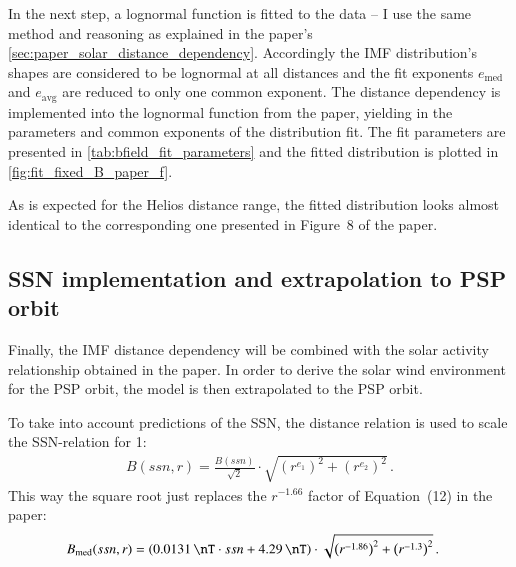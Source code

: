 In the next step, a lognormal function is fitted to the data -- I use the same method and reasoning as explained in the paper's \autoref{sec:paper_solar_distance_dependency}. Accordingly the IMF distribution's shapes are considered to be lognormal at all distances and the fit exponents $e_\text{med}$ and $e_\text{avg}$ are reduced to only one common exponent. The distance dependency is implemented into the lognormal function from the paper, yielding in the parameters and common exponents of the distribution fit. The fit parameters are presented in \autoref{tab:bfield_fit_parameters} and the fitted distribution is plotted in \autoref{fig:fit_fixed_B_paper_f}.
\begin{figure}[htb]
\end{figure}
As is expected for the Helios distance range, the fitted distribution looks almost identical to the corresponding one presented in Figure~8 of the paper.

\subsection{SSN implementation and extrapolation to PSP orbit}
Finally, the IMF distance dependency will be combined with the solar activity relationship obtained in the paper. In order to derive the solar wind environment for the PSP orbit, the model is then extrapolated to the PSP orbit.

To take into account predictions of the SSN, the distance relation is used to scale the SSN-relation for \SI{1}{\au}:
\begin{align}
	B(ssn,r) = \frac{B(ssn)}{\sqrt{2}} \cdot \sqrt{\left(r^{e_1}\right)^2 + \left(r^{e_2}\right)^2}	\,.
\end{align}
This way the square root just replaces the $r^{-1.66}$ factor of Equation~(12) in the paper:
\begin{align}
	B_\text{med}(ssn,r) &= \left(\SI{0.0131}{\nT} \cdot ssn + \SI{4.29}{\nT}\right) \cdot \sqrt{\left(r^{-1.86}\right)^2 + \left(r^{-1.3}\right)^2}	\,.
\end{align}


